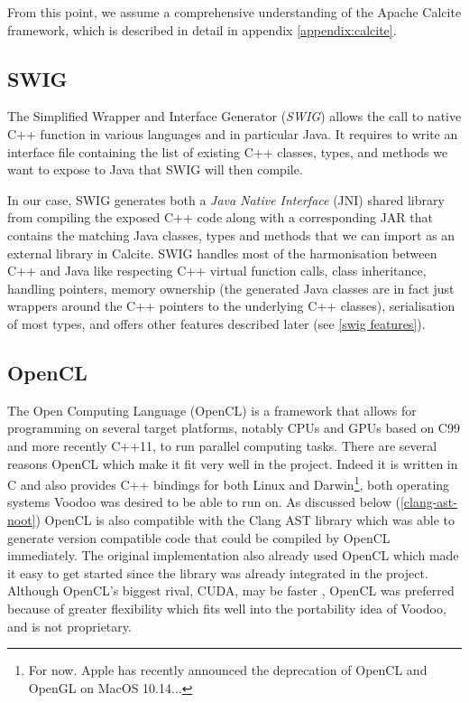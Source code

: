 From this point, we assume a comprehensive understanding of the Apache Calcite framework, which is described in detail in appendix \ref{appendix:calcite}.

\subsection{SWIG\label{swig}}

The Simplified Wrapper and Interface Generator (\emph{SWIG}) \cite{Beazley:1996:SEU:1267498.1267513} allows the call to native C++ function in various languages and in particular Java. It requires to write an interface file containing the list of existing C++ classes, types, and methods we want to expose to Java that SWIG will then compile.

In our case, SWIG generates both a \emph{Java Native Interface} (JNI) shared library from compiling the exposed C++ code along with a corresponding JAR that contains the matching Java classes, types and methods that we can import as an external library in Calcite. SWIG handles most of the harmonisation between C++ and Java like respecting C++ virtual function calls, class inheritance, handling pointers, memory ownership (the generated Java classes are in fact just wrappers around the C++ pointers to the underlying C++ classes), serialisation of most types, and offers other features described later (see \ref{swig features}).

\subsection{OpenCL}

The Open Computing Language (OpenCL) is a framework that allows for programming on several target platforms, notably CPUs and GPUs based on C99 and more recently C++11, to run parallel computing tasks. There are several reasons OpenCL which make it fit very well in the project. Indeed it is written in C and also provides C++ bindings for both Linux and Darwin\footnote{For now. Apple has recently announced the deprecation of OpenCL and OpenGL on MacOS 10.14...}, both operating systems Voodoo was desired to be able to run on. As discussed below (\ref{clang-ast-noot}) OpenCL is also compatible with the Clang AST library which was able to generate version compatible code that could be compiled by OpenCL immediately. The original implementation also already used OpenCL which made it easy to get started since the library was already integrated in the project. Although OpenCL's biggest rival, CUDA, may be faster \cite{article}, OpenCL was preferred because of greater flexibility which fits well into the portability idea of Voodoo, and is not proprietary.

